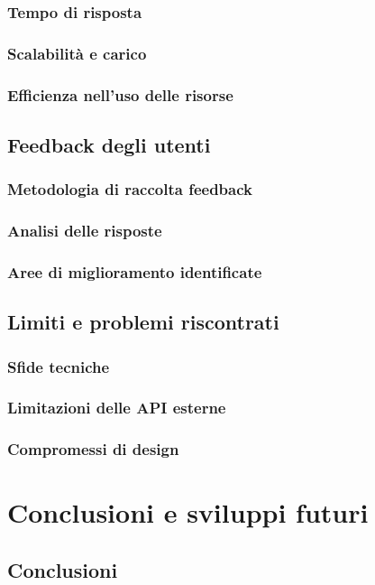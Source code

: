 \documentclass[12pt,a4paper,oneside]{report}
\begin{document}
\subsection{Tempo di risposta}
\subsection{Scalabilità e carico}
\subsection{Efficienza nell'uso delle risorse}

\section{Feedback degli utenti}
\subsection{Metodologia di raccolta feedback}
\subsection{Analisi delle risposte}
\subsection{Aree di miglioramento identificate}

\section{Limiti e problemi riscontrati}
\subsection{Sfide tecniche}
\subsection{Limitazioni delle API esterne}
\subsection{Compromessi di design}





\chapter{Conclusioni e sviluppi futuri}
\section{Conclusioni}
\end{document}
